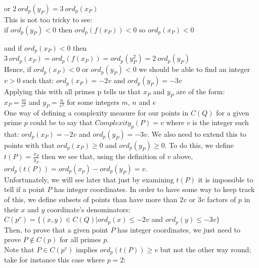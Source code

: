 \documentclass{article}
\begin{document}
or \quad $ 2 \ ord_p(y_P) = 3 \ ord_p(x_P)$\\

This is not too tricky to see:\\

if \quad $ord_p(y_P) < 0$ \quad then \quad $ord_p(f(x_P)) < 0$ \quad so \quad $ord_p(x_P) < 0$

and if \quad $ord_p(x_P) < 0$ \quad then \quad $3 \ ord_p(x_P) = ord_p(f(x_P)) = ord_p(y_P^2) = 2 \ ord_p(y_P)$\\

Hence, if $ord_p(x_P) < 0$ or $ord_p(y_P) < 0$ we should be able to find an integer $v > 0$ such that: $ord_p(x_P) = -2v$ and $ord_p(y_P) = -3v$\\

Applying this with all primes p tells us that $x_P$ and $y_P$ are of the form:\\

$x_P = \frac{m}{e^2}$ \quad and \quad $y_P = \frac{n}{e^3}$ for some integers $m$, $n$ and $e$\\

One way of defining a complexity measure for our points in $C(Q)$ for a given prime $p$ could be to say that $Complexity_p(P) = v$ where $v$ is the integer such that:  $ord_p(x_P) = -2v$ and $ord_p(y_P) = -3v$. We also need to extend this to points with that $ord_p(x_P) \geq 0$ and $ord_p(y_P) \geq 0$. To do this, we define $t(P) = \frac{x_P}{y_P}$ then we see that, using the definition of $v$ above, $ord_p(t(P)) = ord_p(x_p) - ord_p(y_P) = v$. \\ 

Unfortunately, we will see later that just by examining $t(P)$ it is impossible to tell if a point $P$ has integer coordinates. In order to have some way to keep track of this, we define subsets of points than have more than $2v$ or $3v$ factors of $p$ in their $x$ and $y$ coordinate's denominators:\\

$C(p^v) = \{(x, y) \in C(Q) | ord_p(x) \leq -2v$ and $ord_p(y) \leq -3v\}$\\

Then, to prove that a given point $P$ has integer coordinates, we just need to prove $P \notin C(p)$ for all primes $p$.\\

Note that $P \in C(p^v)$ implies $ord_p(t(P)) \geq v$ but not the other way round; take for instance this case where $p = 2$:\\
\end{document}
